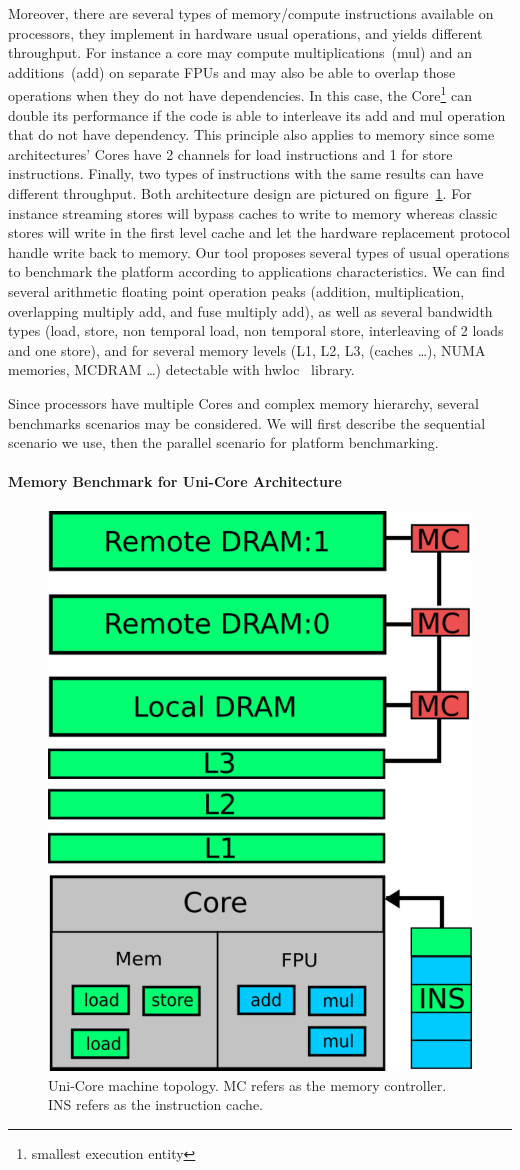 \documentclass[twoside,twocolumn,8pt]{extarticle}
\begin{document}
Moreover, there are several types of memory/compute instructions available on processors, they implement in hardware usual
operations, and yields different throughput. For instance a core may compute multiplications~(mul) and an additions~(add) on
separate FPUs and may also be able to overlap those operations when they do not have dependencies. In this case, the
Core\footnote{smallest execution entity} can double its performance if the code is able to interleave its add and mul operation
that do not have dependency. This principle also applies to memory since some architectures' Cores have 2 channels for load
instructions and 1 for store instructions. Finally, two types of instructions with the same results can have different throughput.
Both architecture design are pictured on figure~\ref{fig:unicore}.
For instance streaming stores will bypass caches to write to memory whereas classic stores will write in the first level cache and
let the hardware replacement protocol handle write back to memory.
Our tool proposes several types of usual operations to benchmark the platform according to applications characteristics.
We can find several arithmetic floating point operation peaks (addition, multiplication, overlapping multiply add, and fuse
multiply add), as well as several bandwidth types (load, store, non temporal load, non temporal store, interleaving of 2 loads and one store), and for several memory levels (L1, L2, L3, (caches \dots), NUMA memories, MCDRAM \dots) detectable with hwloc~\cite{6903671} library.

Since processors have multiple Cores and complex memory hierarchy, several benchmarks scenarios may be considered.
We will first describe the sequential scenario we use, then the parallel scenario for platform benchmarking.

\paragraph{Memory Benchmark for Uni-Core Architecture}
\begin{figure}
  \centering
  \includegraphics[width=.25\textwidth]{pictures/unicore}
  \caption{Uni-Core machine topology. MC refers as the memory controller. INS refers as the instruction cache.}
  \label{fig:unicore}
\end{figure}
\end{document}
